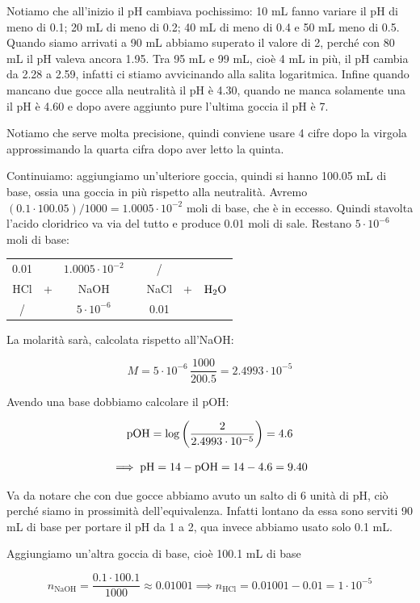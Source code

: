 Notiamo che all'inizio il pH cambiava pochissimo: 10 mL fanno variare il pH di meno di 0.1; 20 mL di meno di 0.2; 40 mL di meno di 0.4 e 50 mL meno di 0.5. Quando siamo arrivati a 90 mL abbiamo superato il valore di 2, perché con 80 mL il pH valeva ancora 1.95. Tra 95 mL e 99 mL, cioè 4 mL in più, il pH cambia da 2.28 a 2.59, infatti ci stiamo avvicinando alla salita logaritmica. Infine quando mancano due gocce alla neutralità il pH è 4.30, quando ne manca solamente una il pH è 4.60 e dopo avere aggiunto pure l'ultima goccia il pH è 7.

Notiamo che serve molta precisione, quindi conviene usare 4 cifre dopo la virgola approssimando la quarta cifra dopo aver letto la quinta.

Continuiamo: aggiungiamo un'ulteriore goccia, quindi si hanno 100.05 mL di base, ossia una goccia in più rispetto alla neutralità. Avremo $(0.1 \cdot 100.05)/1000=1.0005 \cdot 10^{-2}$ moli di base, che è in eccesso. Quindi stavolta l'acido cloridrico va via del tutto e produce 0.01 moli di sale. Restano $5 \cdot 10^{-6}$ moli di base:

\begin{center}
    \begin{tabular}{ccccccc}
        0.01 &  & $1.0005 \cdot 10^{-2}$ & & / & &\\
        HCl & + & NaOH & \ce{->} & NaCl & + & $\rm H_2O$\\
        / &  &  $5 \cdot 10^{-6}$ & & 0.01 & &\\
    \end{tabular}
\end{center}

La molarità sarà, calcolata rispetto all'NaOH:

$$M=5 \cdot 10^{-6} \, \frac{1000}{200.5}=2.4993 \cdot 10^{-5}$$

Avendo una base dobbiamo calcolare il pOH:

$$\rm pOH = \log \left( \frac{2}{2.4993 \cdot 10^{-5}} \right)=4.6$$

$$\implies \rm pH=14 - pOH=14-4.6=9.40$$

Va da notare che con due gocce abbiamo avuto un salto di 6 unità di pH, ciò perché siamo in prossimità dell'equivalenza. Infatti lontano da essa sono serviti 90 mL di base per portare il pH da 1 a 2, qua invece abbiamo usato solo 0.1 mL.

Aggiungiamo un'altra goccia di base, cioè 100.1 mL di base

$$n_{\text{NaOH}}=\frac{0.1 \cdot 100.1}{1000}\approx 0.01001\implies n_{\text{HCl}}=0.01001-0.01 = 1 \cdot 10^{-5}$$

